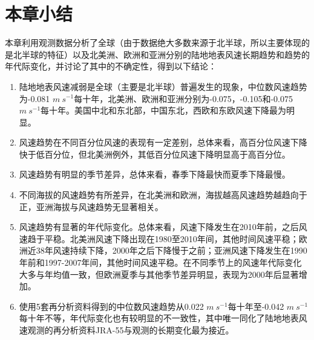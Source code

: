 \section{本章小结}

本章利用观测数据分析了全球（由于数据绝大多数来源于北半球，所以主要体现的是北半球的特征）以及北美洲、欧洲和亚洲分别的陆地地表风速长期趋势和趋势的年代际变化，并讨论了其中的不确定性，得到以下结论：

\begin{enumerate}

\item 陆地地表风速减弱是全球（主要是北半球）普遍发生的现象，中位数风速趋势为-0.081 $m ~ s^{-1}$每十年，北美洲、欧洲和亚洲分别为-0.075，-0.105和-0.075 $m ~ s^{-1}$每十年。美国中北和东北部，中国东北，西欧和东欧风速下降最为明显。

\item 风速趋势在不同百分位风速的表现有一定差别，总体来看，高百分位风速下降快于低百分位，但北美洲例外，其低百分位风速下降明显高于高百分位。

\item 风速趋势有明显的季节差异，总体来看，春季下降最快而夏季下降最慢。

\item 不同海拔的风速趋势有所差异，在北美洲和欧洲，海拔越高风速趋势越趋向于正，亚洲海拔与风速趋势无显著相关。

\item 风速趋势有显著的年代际变化。总体来看，风速下降发生在2010年前，之后风速趋于平稳。北美洲风速下降出现在1980至2010年间，其他时间风速平稳；欧洲近38年风速持续下降，2000年之后下降慢于之前；亚洲风速下降发生在1990年前和1997-2007年间，其他时间风速平稳。在不同季节上的风速年代际变化大多与年均值一致，但欧洲夏季与其他季节差异明显，表现为2000年后显著增加。

\item 使用5套再分析资料得到的中位数风速趋势从0.022 $m ~ s^{-1}$每十年至-0.042 $m ~ s^{-1}$每十年不等，年代际变化也有较明显的不一致性，其中唯一同化了陆地地表风速观测的再分析资料JRA-55与观测的长期变化最为接近。
\end{enumerate}
